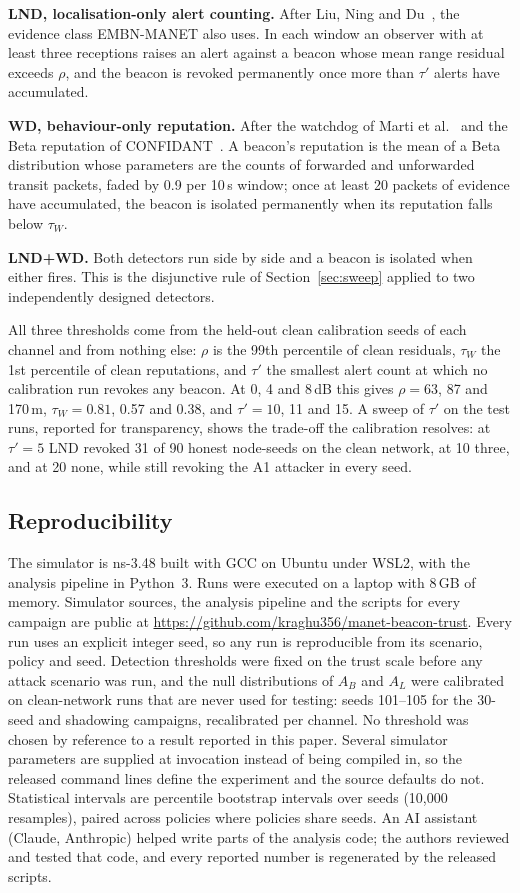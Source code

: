 \textbf{LND, localisation-only alert counting.} After Liu, Ning and
Du~\cite{liu2005detecting}, the evidence class EMBN-MANET also uses. In each
window an observer with at least three receptions raises an alert against a
beacon whose mean range residual exceeds $\rho$, and the beacon is revoked
permanently once more than $\tau'$ alerts have accumulated.

\textbf{WD, behaviour-only reputation.} After the watchdog of Marti
et al.~\cite{marti2000mitigating} and the Beta reputation of
CONFIDANT~\cite{buchegger2002confidant}. A beacon's reputation is the mean of
a Beta distribution whose parameters are the counts of forwarded and
unforwarded transit packets, faded by 0.9 per 10\,s window; once at least 20
packets of evidence have accumulated, the beacon is isolated permanently when
its reputation falls below $\tau_W$.

\textbf{LND+WD.} Both detectors run side by side and a beacon is isolated
when either fires. This is the disjunctive rule of Section~\ref{sec:sweep}
applied to two independently designed detectors.

All three thresholds come from the held-out clean calibration seeds of each
channel and from nothing else: $\rho$ is the 99th percentile of clean
residuals, $\tau_W$ the 1st percentile of clean reputations, and $\tau'$ the
smallest alert count at which no calibration run revokes any beacon. At
0, 4 and 8\,dB this gives $\rho = 63$, 87 and 170\,m, $\tau_W = 0.81$, 0.57
and 0.38, and $\tau' = 10$, 11 and 15. A sweep of $\tau'$ on the test runs,
reported for transparency, shows the trade-off the calibration resolves: at
$\tau' = 5$ LND revoked 31 of 90 honest node-seeds on the clean network, at
10 three, and at 20 none, while still revoking the A1 attacker in every seed.

\subsection{Reproducibility}

The simulator is ns-3.48 built with GCC on Ubuntu under WSL2, with the analysis
pipeline in Python~3. Runs were executed on a laptop with 8\,GB of memory. Simulator sources, the analysis pipeline and the scripts
for every campaign are public at
\url{https://github.com/kraghu356/manet-beacon-trust}. Every run uses an explicit integer seed, so any run is
reproducible from its scenario, policy and seed. Detection thresholds were
fixed on the trust scale before any attack scenario was run, and the null
distributions of $A_B$ and $A_L$ were calibrated on clean-network runs that
are never used for testing: seeds 101--105 for the 30-seed and shadowing
campaigns, recalibrated per channel. No threshold was chosen by reference to a
result reported in this paper. Several simulator parameters are supplied at
invocation instead of being compiled in, so the released command lines
define the experiment and the source defaults do not. Statistical intervals are percentile
bootstrap intervals over seeds (10{,}000 resamples), paired across policies
where policies share seeds. An AI assistant (Claude, Anthropic) helped write
parts of the analysis code; the authors reviewed and tested that code, and
every reported number is regenerated by the released scripts.
